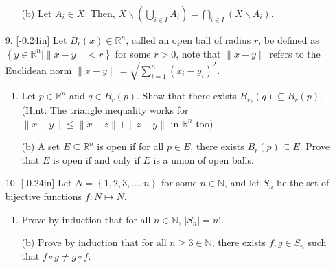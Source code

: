 \documentclass[letterpaper,12pt]{article}
\newcommand{\set}[1]{\left\{ #1 \right\}}
\theoremstyle{definition}
\begin{document}
\pagebreak
\begin{enumerate}
    \item[] \begin{enumerate}
        \item[(b)] Let $A_i \in X$. Then, $X \backslash (\bigcup_{i \in I} A_i)   = \bigcap_{i \in I} (X \backslash A_i )$.
    \end{enumerate}
\end{enumerate}
\pagebreak
\begin{enumerate}
    \item[9.] \reversemarginpar{}[-0.24in] 
 Let $B_r(x) \in \mathbb{R}^n$, called an open ball of radius $r$, be defined as $\set{y \in \mathbb{R}^n | \| x-y \| < r}$ for some $r > 0$, note that $\| x-y \|$ refers to the Euclidean norm $\| x-y \| = \sqrt{\sum_{i=1}^n (x_i - y_i)^2}$. \begin{enumerate}
        \item Let $p \in \mathbb{R}^n$ and $q \in B_r(p)$. Show that there exists $B_{r_2}(q) \subseteq B_r(p)$. (Hint: The triangle inequality works for $\|x - y\| \leq \|x - z\| + \|z -y \|$ in $\mathbb{R}^n$ too)
    \end{enumerate}
\end{enumerate}
\pagebreak
\begin{enumerate}
    \item[] \begin{enumerate}
        \item[(b)] A set $E \subseteq \mathbb{R}^n$ is open if for all $p \in E$, there exists $B_r(p) \subseteq E$. Prove that $E$ is open if and only if $E$ is a union of open balls.
    \end{enumerate}
\end{enumerate}
\pagebreak
\begin{enumerate}
    \item[10.] \reversemarginpar{}[-0.24in] 
Let $N= \set{1,2,3,\ldots,n}$ for some $n \in \mathbb{N}$, and let $S_n$ be the set of bijective functions $f: N \mapsto N$. \begin{enumerate}
    \item Prove by induction that for all $n \in \mathbb{N}$, $|S_n|=n!$.
\end{enumerate}
\end{enumerate}
\pagebreak
\begin{enumerate}
   \item[] \begin{enumerate}
       \item[(b)]  Prove by induction that for all $n \geq 3 \in \mathbb{N}$, there exists $f,g \in S_n$ such that $f \circ g \neq g \circ f$.
   \end{enumerate}
\end{enumerate}
\end{document}

